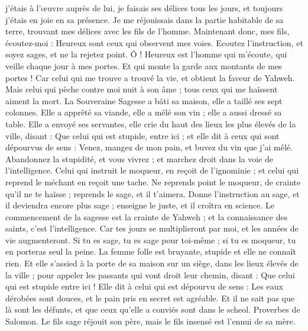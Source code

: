 \begin{multicols}{2}
j'étais à l'œuvre auprès de lui, je faisais ses délices tous les jours, et toujours j'étais en joie en sa présence.
Je me réjouissais dans la partie habitable de sa terre, trouvant mes délices avec les fils de l'homme.
Maintenant donc, mes fils, écoutez-moi : Heureux sont ceux qui observent mes voies.
Ecoutez l'instruction, et soyez sages, et ne la rejetez point.
Ô ! Heureux est l'homme qui m'écoute, qui veille chaque jour à mes portes. Et qui monte la garde aux montants de mes portes !
Car celui qui me trouve a trouvé la vie, et obtient la faveur de Yahweh.
Mais celui qui pèche contre moi nuit à son âme ; tous ceux qui me haïssent aiment la mort.
\VerseOne{}La Souveraine Sagesse a bâti sa maison, elle a taillé ses sept colonnes.
Elle a apprêté sa viande, elle a mêlé son vin ; elle a aussi dressé sa table.
Elle a envoyé ses servantes, elle crie du haut des lieux les plus élevés de la ville, disant : 
Que celui qui est stupide, entre ici ; et elle dit à ceux qui sont dépourvus de sens :
Venez, mangez de mon pain, et buvez du vin que j'ai mêlé.
Abandonnez la stupidité, et vous vivrez ; et marchez droit dans la voie de l'intelligence.
Celui qui instruit le moqueur, en reçoit de l'ignominie ; et celui qui reprend le méchant en reçoit une tache.
Ne reprends point le moqueur, de crainte qu'il ne te haïsse ; reprends le sage, et il t'aimera.
Donne l'instruction au sage, et il deviendra encore plus sage ; enseigne le juste, et il croîtra en science.
Le commencement de la sagesse est la crainte de Yahweh ; et la connaissance des saints, c'est l'intelligence.
Car tes jours se multiplieront par moi, et les années de vie augmenteront.
Si tu es sage, tu es sage pour toi-même ; si tu es moqueur, tu en porteras seul la peine.
La femme folle est bruyante, stupide et elle ne connaît rien.
Et elle s'assied à la porte de sa maison sur un siège, dans les lieux élevés de la ville ;
pour appeler les passants qui vont droit leur chemin, disant :
Que celui qui est stupide entre ici ! Elle dit à celui qui est dépourvu de sens :
Les eaux dérobées sont douces, et le pain pris en secret est agréable.
Et il ne sait pas que là sont les défunts, et que ceux qu'elle a conviés sont dans le scheol.
\VerseOne{}Proverbes de Salomon. Le fils sage réjouit son père, mais le fils insensé est l'ennui de sa mère.

\end{multicols}

